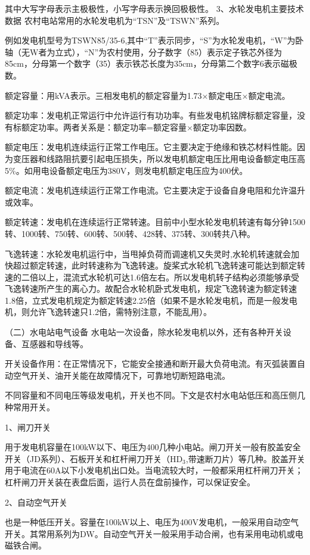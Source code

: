 \documentclass{ctexbook}
\begin{document}
其中大写字母表示主极极性，小写字母表示换回极极性。
3、水轮发电机主要技术数据
农村电站常用的水轮发电机为“TSN”及“TSWN”系列。
	
例如发电机型号为TSWN85/35-6,其中“T”表示同步，“S”为水轮发电机，“W”为卧轴（无W者为立式），“N”为农村使用，分子数字（85）表示定子铁芯外径为85cm，分母第一个数字（35）表示铁芯长度为35cm，分母第二个数字6表示磁极数。

额定容量：用kVA表示。三相发电机的额定容量为1.73$\times$额定电压$\times$额定电流。

额定功率：发电机正常运行中允许运行有功功率。有些发电机铭牌标额定容量，没有标额定功率。两者关系是：额定功率=额定容量$\times$额定功率因数。

额定电压：发电机连续运行正常工作电压。它主要决定于绝缘和铁芯材料性能。因为变压器和线路阻抗要引起电压损失，所以发电机额定电压比用电设备额定电压高5\%。如用电设备额定电压为380V，则发电机额定电压应为400伏。

额定电流：发电机连续运行正常工作电流。它主要决定于设备自身电阻和允许温升或效率。

额定转速：发电机在连续运行正常转速。目前中小型水轮发电机转速有每分钟1500转、1000转、750转、600转、500转、428转、375转、300转共八种。

飞逸转速：水轮发电机运行中，当甩掉负荷而调速机又失灵时,水轮机转速就会加快超过额定转速，此时转速称为飞逸转速。旋桨式水轮机飞逸转速可能达到额定转速的二倍以上，混流式水轮机可达1.6倍左右。所以发电机转子结构必须能够承受飞逸转速所产生的离心力。故配合水轮机卧式发电机，规定飞逸转速为额定转速1.8倍，立式发电机规定为额定转速2.25倍（如果不是水轮发电机，而是一般发电机，则允许飞逸转速只1.2倍，需特别注意，不能乱用）。

（二）水电站电气设备
水电站一次设备，除水轮发电机以外，还有各种开关设备、互感器和导线等。

开关设备作用：在正常情况下，它能安全接通和断开最大负荷电流。有灭弧装置自动空气开关、油开关能在故障情况下，可靠地切断短路电流。

不同容量和不同电压等级发电机，开关也不同。下文是农村水电站低压和高压侧几种常用开关。

1、闸刀开关

用于发电机容量在100kW以下、电压为400几种小电站。闸刀开关一般有胶盖安全开关（JD系列）、石板开关和杠杆闸刀开关（HD$_3$,带速断刀片）等几种。胶盖开关用于电流在60A以下小发电机出口处。当电流较大时，一般都采用杠杆闸刀开关；杠杆闸刀开关装在表盘后面，运行人员在盘前操作，可以保证安全。

2、自动空气开关

也是一种低压开关。容量在100kW以上、电压为400V发电机，一般采用自动空气开关。其常用系列为DW。自动空气开关一般采用手动合闸，也有采用电动机或电磁铁合闸。
\end{document}
